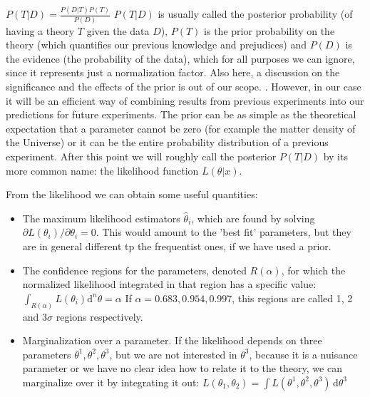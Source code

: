 \beeq$ \label{eq:BayesTheorem}
P(T | D) = \frac{P(D | T) P(T)}{P(D)}$
$P(T | D)$ is usually called the posterior probability (of having a theory $T$ given the data $D$), 
$P(T)$ is the prior probability on the theory (which quantifies our previous knowledge and prejudices)
and $P(D)$ is the evidence (the probability of the data), which for all purposes we can ignore, since it
represents just a normalization factor.
Also here, a discussion on the significance and the effects of the prior is out of our scope. \cite{cite Amendola, Dodelson, Gregory, reviews}. However, in our case it will be an efficient way of combining results from previous
experiments into our predictions for future experiments. The prior can be as simple as the theoretical expectation
that a parameter cannot be zero (for example the matter density of the Universe) or it can be the entire
probability distribution of a previous experiment.
After this point we will roughly call the posterior $P(T | D)$ by its more common name: the likelihood function
$L(\theta | x)$.

From the likelihood we can obtain some useful quantities:
\begin{itemize}
	\item The maximum likelihood estimators $\hat{\theta}_{i}$,
	which are found by solving \\ $\partial L(\theta_i)/\partial\theta_i = 0$.
	This would amount to the 'best fit' parameters, but they
	are in general different tp the frequentist ones, if we have used a prior.
	\item The confidence regions for the parameters, denoted $R(\alpha)$, for which
	the normalized likelihood integrated in that region has a specific value:\\ 
	\beeqp$\label{eq:likeli-confidregions}
	\int_{R(\alpha)}  L(\theta_i) \mathrm{d}^n \theta = \alpha$
	If $\alpha=0.683,0.954,0.997$, this regions are called 1, 2 and 3$\sigma$ regions respectively.
	\item Marginalization over a parameter. If the likelihood depends on 
	three parameters $\theta^1, \theta^2, \theta^3$, but we are not interested in $\theta^3$, because it is a nuisance parameter
	or we have no clear idea how to relate it to the theory, we can marginalize over it by integrating 
	it out: $L(\theta_1, \theta_2) = \int L(\theta^1, \theta^2, \theta^3) \,\mathrm{d}\theta^3 $
	
\end{itemize}

